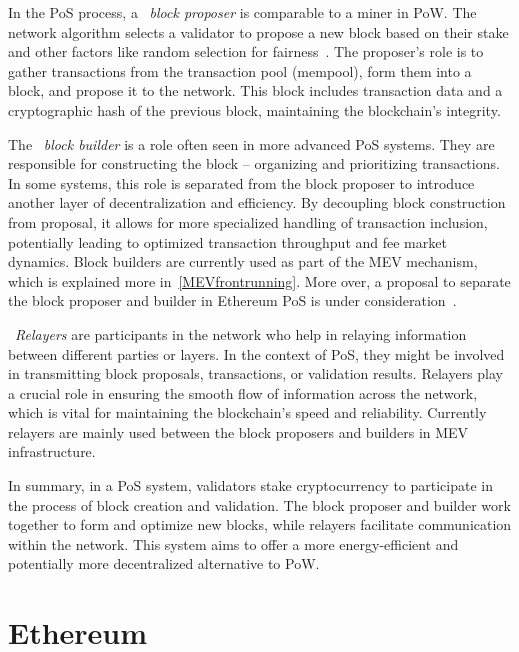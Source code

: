 In the PoS process, a ~\textit{block proposer} is comparable to a miner in PoW. The network algorithm selects a validator to propose a new block based on their stake and other factors like random selection for fairness~\cite{ethereumrandao}. The proposer's role is to gather transactions from the transaction pool (mempool), form them into a block, and propose it to the network. This block includes transaction data and a cryptographic hash of the previous block, maintaining the blockchain's integrity.

The ~\textit{block builder} is a role often seen in more advanced PoS systems. They are responsible for constructing the block – organizing and prioritizing transactions. In some systems, this role is separated from the block proposer to introduce another layer of decentralization and efficiency. By decoupling block construction from proposal, it allows for more specialized handling of transaction inclusion, potentially leading to optimized transaction throughput and fee market dynamics. Block builders are currently used as part of the MEV mechanism, which is explained more in~\ref{MEVfrontrunning}. More over, a proposal to separate the block proposer and builder in Ethereum PoS is under consideration~\cite{ethereumPBS}.

~\textit{Relayers} are participants in the network who help in relaying information between different parties or layers. In the context of PoS, they might be involved in transmitting block proposals, transactions, or validation results. Relayers play a crucial role in ensuring the smooth flow of information across the network, which is vital for maintaining the blockchain's speed and reliability. Currently relayers are mainly used between the block proposers and builders in MEV infrastructure.

In summary, in a PoS system, validators stake cryptocurrency to participate in the process of block creation and validation. The block proposer and builder work together to form and optimize new blocks, while relayers facilitate communication within the network. This system aims to offer a more energy-efficient and potentially more decentralized alternative to PoW.




\section{Ethereum}

